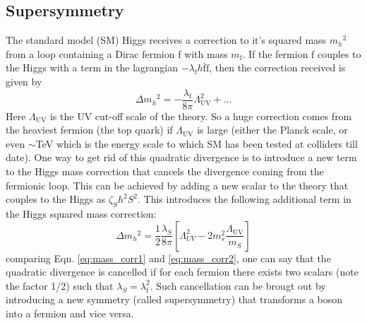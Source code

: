 \documentclass[11.5pt, a4paper]{article}
\newcommand{\mf}{\ensuremath{m_{\mathrm{f}}}}
\newcommand{\mh}{\ensuremath{m_{h}}}
\begin{document}
\subsection{Supersymmetry}\label{SUSY}

The standard model (SM) Higgs receives a correction to it's squared mass $\mh^{2}$ from a loop containing a Dirac fermion f with mass $\mf$. If the fermion f couples to the Higgs with a term in the lagrangian $-\lambda_{\text{f}}h\bar{\text{f}}\text{f}$, then the correction received is given by
\begin{equation}
	\Delta\mh^{2} = -\frac{\lambda_{\text{f}}}{8\pi}\Lambda_{\text{UV}}^{2}+...
	\label{eq:mass_corr1}
\end{equation} 
Here $\Lambda_{\text{UV}}$ is the UV cut-off scale of the theory. So a huge correction comes from the heaviest fermion (the top quark) if $\Lambda_{\text{UV}}$ is large (either the Planck scale, or even $\sim$TeV which is the energy scale to which SM has been tested at colliders till date). One way to get rid of this quadratic divergence is to introduce a new term to the Higgs mass correction that cancels the divergence coming from the fermionic loop. This can be achieved by adding a new scalar to the theory that couples to the Higgs as $\zeta_{S}h^{2}S^{2}$. This introduces the following additional term in the Higgs squared mass correction:
\begin{equation}
	\Delta\mh^{2}=\frac{1}{2}\frac{\lambda_{S}}{8\pi}\left[\Lambda_{UV}^{2}-2m_{s}^{2}\frac{\Lambda_{\text{UV}}}{m_{S}}\right]
	\label{eq:mass_corr2}
\end{equation} 
comparing Eqn. \ref{eq:mass_corr1} and \ref{eq:mass_corr2}, one can say that the quadratic divergence is cancelled if for each fermion there exists two scalars (note the factor 1/2) such that $\lambda_{S}=\lambda_{\text{f}}^{2}$. Such cancellation can be brougt out by introducing a new symmetry (called supersymmetry) that transforms a boson into a fermion and vice versa.\\
\end{document}
